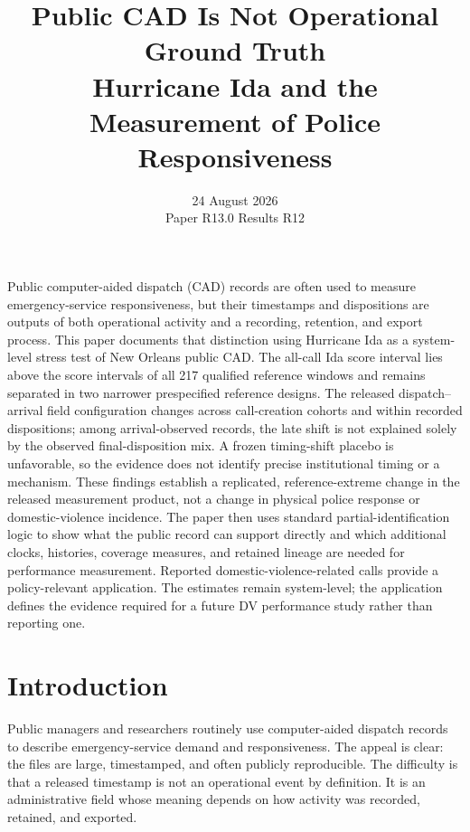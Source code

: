 \documentclass[11pt]{article}
\title{\vspace{-1.7em}\textbf{Public CAD Is Not Operational Ground Truth}\\[0.35em]
\large Hurricane Ida and the Measurement of Police Responsiveness}
\author{}
\date{24 August 2026\\[0.2em]\small Paper R13.0 \quad Results R12}
\begin{document}
\maketitle
\thispagestyle{plain}
\vspace{-1.3em}

\begin{plainbox}[title=Abstract]
Public computer-aided dispatch (CAD) records are often used to measure emergency-service responsiveness, but their timestamps and dispositions are outputs of both operational activity and a recording, retention, and export process. This paper documents that distinction using Hurricane Ida as a system-level stress test of New Orleans public CAD. The all-call Ida score interval lies above the score intervals of all 217 qualified reference windows and remains separated in two narrower prespecified reference designs. The released dispatch--arrival field configuration changes across call-creation cohorts and within recorded dispositions; among arrival-observed records, the late shift is not explained solely by the observed final-disposition mix. A frozen timing-shift placebo is unfavorable, so the evidence does not identify precise institutional timing or a mechanism. These findings establish a replicated, reference-extreme change in the released measurement product, not a change in physical police response or domestic-violence incidence. The paper then uses standard partial-identification logic to show what the public record can support directly and which additional clocks, histories, coverage measures, and retained lineage are needed for performance measurement. Reported domestic-violence-related calls provide a policy-relevant application. The estimates remain system-level; the application defines the evidence required for a future DV performance study rather than reporting one.
\end{plainbox}


\newpage

\section{Introduction}

Public managers and researchers routinely use computer-aided dispatch records to describe emergency-service demand and responsiveness. The appeal is clear: the files are large, timestamped, and often publicly reproducible. The difficulty is that a released timestamp is not an operational event by definition. It is an administrative field whose meaning depends on how activity was recorded, retained, and exported.
\end{document}
